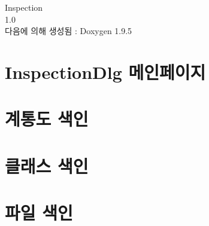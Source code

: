\documentclass[twoside]{book}
\newcommand{\+}{\discretionary{\mbox{\scriptsize$\hookleftarrow$}}{}{}}
\newcommand{\clearemptydoublepage}{%
    \newpage{\pagestyle{empty}\cleardoublepage}%
  }
\begin{document}
  \raggedbottom
    \hypersetup{pageanchor=false,
                bookmarksnumbered=true,
                pdfencoding=unicode
               }
  \begin{titlepage}
  \vspace*{7cm}
  \begin{center}%
  {\Large Inspection}\\
  [1ex]\large 1.\+0 \\
  \vspace*{1cm}
  {\large 다음에 의해 생성됨 \+:  Doxygen 1.9.5}\\
  \end{center}
  \end{titlepage}
  \clearemptydoublepage
  \tableofcontents
  \clearemptydoublepage
  \hypersetup{pageanchor=true}
\chapter{Inspection\+Dlg 메인페이지}
\label{index}\hypertarget{index}{}
\chapter{계통도 색인}

\chapter{클래스 색인}

\chapter{파일 색인}

\end{document}
